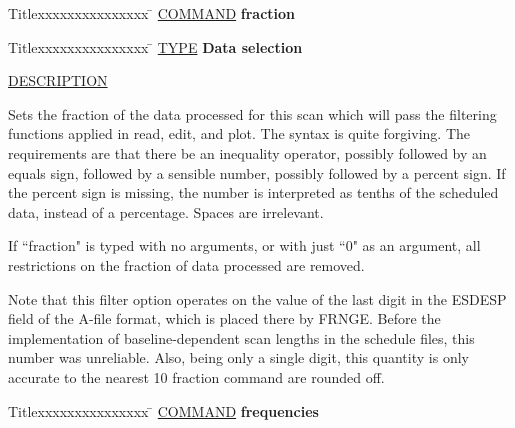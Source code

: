 \begin{tabbing}
Titlexxxxxxxxxxxxxxx \= \kill
\underline{COMMAND} \> {\bf 	fraction} \\
\end{tabbing}

\begin{tabbing}
Titlexxxxxxxxxxxxxxx \= \kill
\underline{TYPE} \> {\bf 		Data selection} \\
\end{tabbing}


\underline{DESCRIPTION}
\begin{list}{}{\setlength{\leftmargin}{0.5in}
     \setlength{\rightmargin}{0in}}
\item
Sets the fraction of the data processed for this scan which
will pass the filtering functions applied in read, edit, and
plot.  The syntax is quite forgiving.  The requirements are
that there be an inequality operator, possibly followed by
an equals sign, followed by a sensible number, possibly followed
by a percent sign.  If the percent sign is missing, the number
is interpreted as tenths of the scheduled data, instead of a 
percentage.  Spaces are irrelevant.
\item
If ``fraction" is typed with no arguments, or with
just ``0" as an argument, all restrictions on the fraction of
data processed are removed.
\item
Note that this filter option operates on the value of the last
digit in the ESDESP field of the A-file format, which is placed
there by FRNGE.  Before the implementation of baseline-dependent
scan lengths in the schedule files, this number was unreliable.
Also, being only a single digit, this quantity is only accurate
to the nearest 10%
fraction command are rounded off.
\item
\end{list}
\vspace{.2in}

\begin{tabbing}
Titlexxxxxxxxxxxxxxx \= \kill
\underline{COMMAND} \> {\bf 	frequencies} \\
\end{tabbing}

